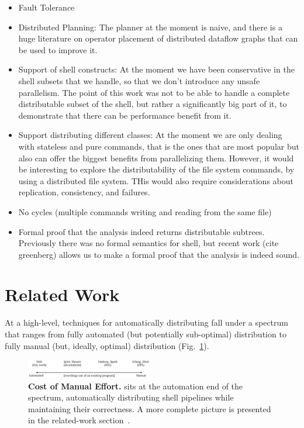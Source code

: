 \documentclass[sigplan,10pt,review,anonymous]{acmart}
\begin{document}
\begin{itemize}
\item Fault Tolerance
\item Distributed Planning: The planner at the moment is naive, and
  there is a huge literature on operator placement of distributed
  dataflow graphs that can be used to improve it.
\item Support of shell constructs: At the moment we have been
  conservative in the shell subsets that we handle, so that we don't
  introduce any unsafe parallelism. The point of this work was not to
  be able to handle a complete distributable subset of the shell, but
  rather a significantly big part of it, to demonstrate that there can
  be performance benefit from it.
\item Support distributing different classes: At the moment we are
  only dealing with stateless and pure commands, that is the ones that
  are most popular but also can offer the biggest benefits from
  parallelizing them. However, it would be interesting to explore the
  distributability of the file system commands, by using a distributed
  file system. THis would also require considerations about
  replication, consistency, and failures.
\item No cycles (multiple commands writing and reading from the same file)
\item Formal proof that the analysis indeed returns distributable
  subtrees. Previously there was no formal semantics for shell, but
  recent work (cite greenberg) allows us to make a formal proof that
  the analysis is indeed sound.
\end{itemize}

\section{Related Work}
\label{related}

At a high-level, techniques for automatically distributing fall under a spectrum that ranges from fully automated (but potentially sub-optimal) distribution to fully manual (but, ideally, optimal) distribution (Fig.~\ref{fig:spectrum}).

\begin{figure}[t]
\centering
\includegraphics[width=0.49\textwidth]{./figs/dish_spectrum.pdf}
\caption{
  \textbf{Cost of Manual Effort.}
	\sys sits at the automation end of the spectrum, automatically distributing shell pipelines while maintaining their correctness. A more complete picture is presented in the related-work section~.
}
\label{fig:spectrum}
\end{figure}
\end{document}
